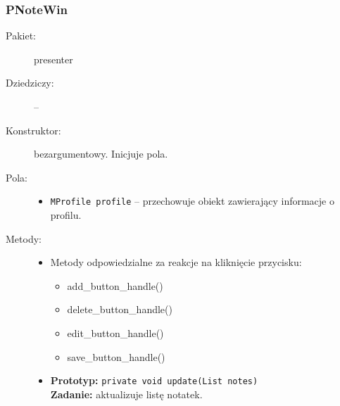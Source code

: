 \documentclass[a4paper]{article}
\newcommand{\prog}{\texttt}
\begin{document}
\subsubsection{PNoteWin}
\begin{description}
    \item[Pakiet:] presenter
    \item[Dziedziczy:] --
    \item[Konstruktor:] bezargumentowy. Inicjuje pola.
    \item[Pola:] \hfill
    \begin{itemize}
        \item \prog{MProfile profile} -- przechowuje obiekt zawierający informacje o profilu.
    \end{itemize}
    \item[Metody:] \hfill
    \begin{itemize}
        \item Metody odpowiedzialne za reakcje na kliknięcie przycisku:
        \begin{itemize}
            \item add\_button\_handle()
            \item delete\_button\_handle()
            \item edit\_button\_handle()
            \item save\_button\_handle()
        \end{itemize}
        \item \textbf{Prototyp:} \prog{private void update(List notes)}\\\textbf{Zadanie:} aktualizuje listę notatek.
    \end{itemize}
\end{description}
\end{document}
